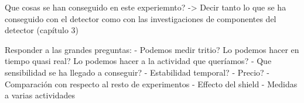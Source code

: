 Que cosas se han conseguido en este experiemnto? -> Decir tanto lo que se ha conseguido con el detector como con las investigaciones de componentes del detector (capítulo 3)

Responder a las grandes preguntas:
	- Podemos medir tritio? Lo podemos hacer en tiempo quasi real? Lo podemos hacer a la actividad que queríamos?
	- Que sensibilidad se ha llegado a conseguir?
	- Estabilidad temporal?
	- Precio?
	- Comparación con respecto al resto de experimentos
	- Effecto del shield
	- Medidas a varias actividades
	